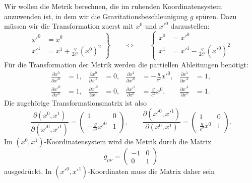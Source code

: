 Wir wollen die Metrik berechnen, die im ruhenden Koordinatensystem
anzuwenden ist, in dem wir die Gravitationsbeschleunigung $g$ spüren. 
Dazu müssen wir die Transformation zuerst mit $x^0$ und $x'^0$ 
darzustellen:
\begin{equation}
\left.
\begin{aligned}
x'^0 &= x^0 \\
x'^1 &= x^1+\frac{g}{2c^2}(x^0)^2
\end{aligned}
\right\}
\qquad
\Leftrightarrow
\qquad
\left\{
\begin{aligned}
x^0 &= x'^0 \\
x^1 &= x'^1 - \frac{g}{2c^2}(x'^0)^2
\end{aligned}
\right.
\end{equation}
Für die Transformation der Metrik werden die partiellen Ableitungen
benötigt:
\begin{equation}
\begin{aligned}
\frac{\partial x^0}{\partial x'^0}&=1,
&
\frac{\partial x^0}{\partial x'^1}&=0,
&
\frac{\partial x^1}{\partial x'^0}&=-\frac{g}{c^2}x'^0,
&
\frac{\partial x^1}{\partial x'^1}&=1,
\\
\frac{\partial x'^0}{\partial x^0}&=1,
&
\frac{\partial x'^0}{\partial x^1}&=0,
&
\frac{\partial x'^1}{\partial x^0}&=\frac{g}{c^2}x^0,
&
\frac{\partial x'^1}{\partial x^1}&=1.
\end{aligned}
\end{equation}
Die zugehörige Transformationsmatrix ist also
\begin{equation}
\frac{\partial (x^0, x^1)}{\partial (x'^0, x'^1)}
=
\begin{pmatrix}
1&0\\
-\frac{g}{c^2}x'^0&1
\end{pmatrix},
\qquad
\frac{\partial (x'^0, x'^1)}{\partial (x^0, x^1)}
=
\begin{pmatrix}
1&0\\
\frac{g}{c^2}x^0&1
\end{pmatrix}.
\end{equation}
Im $(x^0,x^1)$-Koordinatensystem wird die Metrik durch die Matrix
\[
g_{\mu\nu}
=
\begin{pmatrix}-1&0\\0&1\end{pmatrix}
\]
ausgedrückt.
In $(x'^0,x'^1)$-Koordinaten muss die Matrix daher sein
